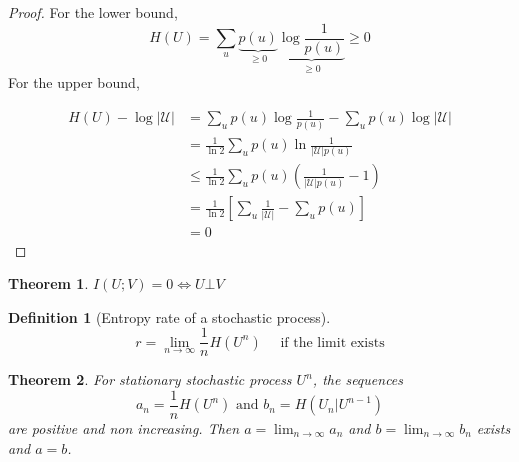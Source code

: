 \documentclass{article}
\newtheorem{theorem}{Theorem}[section]
\newtheorem{definition}{Definition}[section]
\theoremstyle{definition} %
\def\U{\mathcal{U}}
\begin{document}
\begin{proof}
For the lower bound,
  \[
    H(U) = \sum_u \underbrace{p(u)}_{\geq 0} \underbrace{\log \frac 1 {p(u)}}_{\geq 0} \geq 0
  \]
For the upper bound,

\begin{align*}
  H(U) - \log | \U |
  &= \sum_u p(u) \log \frac 1 {p(u)} - \sum_u p(u) \log |\U|\\
  &= \frac 1 {\ln 2} \sum_u p(u) \ln \frac 1 {|\U | p(u)}\\
  &\leq \frac 1 {\ln 2} \sum_u p(u) \left(\frac 1 {|\U | p(u)} - 1 \right)\\
  &=\frac 1 {\ln 2} \left[ \sum_u \frac 1 {|\U |} - \sum_u p(u) \right]\\
  &=0
\end{align*}
\end{proof}

\begin{theorem}
  $I(U;V) = 0 \iff U \bot V$
\end{theorem}


\begin{definition}[Entropy rate of a stochastic process]
  $$ r = \lim_{n\to \infty} \frac 1 n H(U^n) \quad \text{ if the limit exists} $$
\end{definition}

\begin{theorem}
  For stationary stochastic process $U^n$, the sequences
  \[
    a_n = \frac 1 n H(U^n) \text{ and } b_n = H(U_n|U^{n-1})
  \]
  are positive and non increasing. Then $a=\lim_{n\to \infty} a_n$ and $b=\lim_{n\to \infty} b_n$ exists and $a=b$.
\end{theorem}
\end{document}
